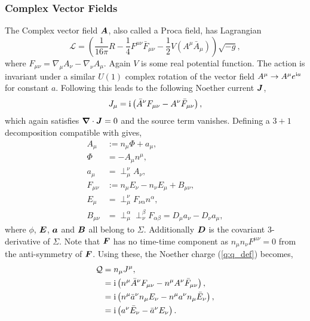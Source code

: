 \subsubsection{Complex Vector Fields} \label{q:sect:noether2}
The Complex vector field $\boldsymbol{A}$, also called a Proca field, has Lagrangian
\begin{equation}
\mathcal{L} = \left(\frac{1}{16 \pi }R -\frac{1}{4}F^{\mu\nu}\bar{F}_{\mu\nu} - \frac{1}{2}V(A^\mu \bar{A}_\mu) \right)\sqrt{-g},
\end{equation}
where $F_{\mu\nu} = \nabla_\mu A_\nu - \nabla_\nu A_\mu$. Again $V$ is some real potential function. The action is invariant under a similar $U(1)$ complex rotation of the vector field $A^\mu \rightarrow A^\mu e^{{\rm i} a}$ for constant $a$. Following \cite{Minamitsuji_2018} this leads to the following Noether current $\boldsymbol{J}$,
\begin{align}
J_\mu = {\rm i}\left(\bar{A}^\nu F_{\mu\nu} - A^\nu \bar{F}_{\mu\nu} \right),
\end{align}
which again satisfies $\boldsymbol{\nabla}\cdot \boldsymbol{J} =0$ and the source term vanishes. Defining a $3+1$ decomposition compatible with \cite{Zilh_o_2015} gives,
\begin{align}
A_\mu &:= n_\mu \Phi + a_\mu, \\
\Phi &= -A_\mu n^\mu, \\
a_\mu &= \perp^\nu_\mu A_\nu, \\
F_{\mu\nu} &:= n_\mu E_\nu - n_\nu E_\mu + B_{\mu\nu}, \\
E_\mu &= \perp^\nu_\mu F_{\nu\alpha}n^\alpha, \\
B_{\mu\nu} &= \perp^\alpha_\mu \perp^\beta_\nu F_{\alpha\beta} = D_\mu a_\nu - D_\nu a_\mu,
\end{align}
where $\phi$, $\boldsymbol{E}$, $\boldsymbol{a}$ and $\boldsymbol{B}$ all belong to $\Sigma$. Additionally $\boldsymbol{D}$ is the covariant 3-derivative of $\Sigma$. Note that $\boldsymbol{F}$ has no time-time component as $n_\mu n_\nu F^{\mu\nu} =0$ from the anti-symmetry of $\boldsymbol{F}$. Using these, the Noether charge (\ref{q:q_def}) becomes,
\begin{align}
\mathcal{Q}&= n_\mu J^\mu, \\
           &={\rm i}\left( n^\mu \bar{A}^\nu F_{\mu\nu} - n^\mu A^\nu \bar{F}_{\mu\nu}  \right), \\
           &={\rm i}\left( n^\mu \bar{a}^\nu n_\mu E_\nu - n^\mu a^\nu n_\mu \bar{E}_{\nu}  \right), \\
           &={\rm i}\left( a^\nu \bar{E}_{\nu}  - \bar{a}^\nu E_\nu  \right).
\end{align}
